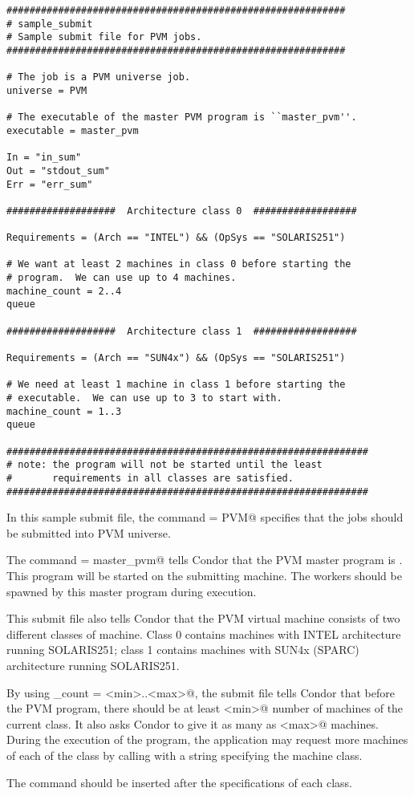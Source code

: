 \CondorSmall
\begin{verbatim}
###########################################################
# sample_submit
# Sample submit file for PVM jobs. 
###########################################################

# The job is a PVM universe job.
universe = PVM  

# The executable of the master PVM program is ``master_pvm''.
executable = master_pvm

In = "in_sum"
Out = "stdout_sum"
Err = "err_sum"

###################  Architecture class 0  ##################

Requirements = (Arch == "INTEL") && (OpSys == "SOLARIS251") 

# We want at least 2 machines in class 0 before starting the 
# program.  We can use up to 4 machines.
machine_count = 2..4  
queue

###################  Architecture class 1  ##################

Requirements = (Arch == "SUN4x") && (OpSys == "SOLARIS251") 

# We need at least 1 machine in class 1 before starting the 
# executable.  We can use up to 3 to start with.
machine_count = 1..3
queue

###############################################################
# note: the program will not be started until the least 
#       requirements in all classes are satisfied.
###############################################################
\end{verbatim}
\normalsize


In this sample submit file, the command \verb@universe = PVM@
specifies that the jobs should be submitted into PVM universe.

The command \verb@executable = master_pvm@ tells Condor that the PVM
master program is .  This program will be started on
the submitting machine.  The workers should be spawned by this master
program during execution.

This submit file also tells Condor that the PVM virtual machine
consists of two different classes of machine.  Class
0 contains machines with INTEL architecture running SOLARIS251; class
1 contains machines with SUN4x (SPARC) architecture running SOLARIS251.

By using \verb@machine_count = <min>..<max>@, the submit file tells
Condor that before the PVM program, there should be at least \verb@<min>@
number of machines of the current class.  It also asks Condor to give
it as many as \verb@<max>@ machines.  During the execution of the program,
the application may request more machines of each of the class by calling
 with a string specifying the machine
class.

The  command should be inserted after the specifications of
each class.

